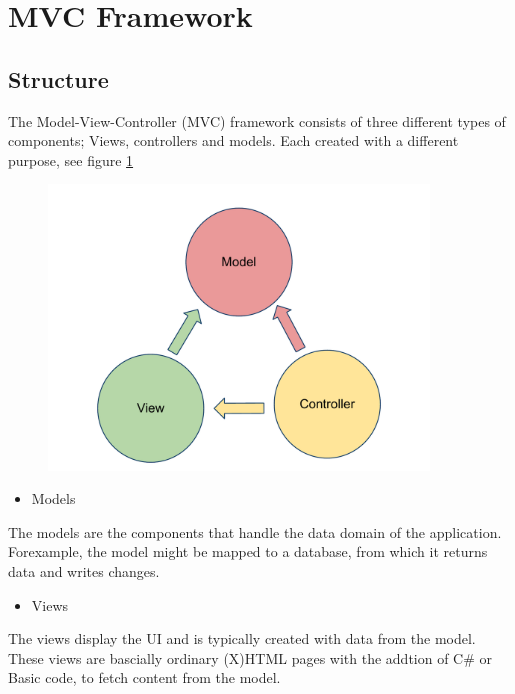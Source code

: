 \section{MVC Framework}
\label{sec:mvc}


\subsection{Structure}

The Model-View-Controller (MVC) framework consists of three different types of components; Views, controllers and models. Each created with a different purpose, see figure \ref{fig:mvc-drawing}

\begin{figure}[h]
	\centering
		\includegraphics[width=0.90\textwidth]{input/implementation/mvc/MVC.pdf}
	\label{fig:mvc-drawing}
\end{figure}


\begin{itemize}
\item Models
\end{itemize}
The models are the components that handle the data domain of the application. Forexample, the model might be mapped to a database, from which it returns data and writes changes.

\begin{itemize}
\item Views
\end{itemize}
The views display the UI and is typically created with data from the model. These views are bascially ordinary (X)HTML pages with the addtion of   C\# or Basic code, to fetch content from the model.

